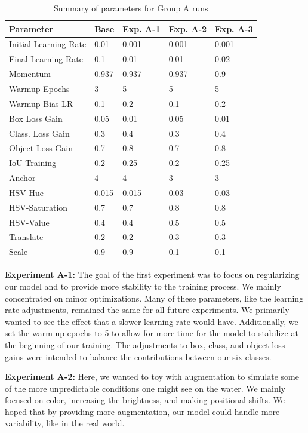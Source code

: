 \documentclass[sigplan,nonacm]{acmart}
\begin{document}
\begin{table}[H]
\centering

\begin{tabular}{|l |l |l |l |l|} \hline  
Parameter & Base& Exp. A-1& Exp. A-2& Exp. A-3\\ \hline 
Initial Learning Rate& 0.01 & 0.001 & 0.001 & 0.001 \\ \hline 
Final Learning Rate& 0.1 & 0.01 & 0.01 & 0.02 \\ \hline 
Momentum& 0.937 & 0.937 & 0.937 & 0.9 \\ \hline 
Warmup Epochs& 3 & 5 & 5 & 5 \\ \hline 
Warmup Bias LR& 0.1 & 0.2 & 0.1 & 0.2 \\ \hline 
Box Loss Gain& 0.05 & 0.01 & 0.05 & 0.01 \\ \hline 
Class. Loss Gain& 0.3 & 0.4 & 0.3 & 0.4 \\ \hline 
Object Loss Gain& 0.7 & 0.8 & 0.7 & 0.8 \\ \hline 
IoU Training& 0.2 & 0.25 & 0.2 & 0.25 \\ \hline 
Anchor& 4 & 4 & 3 & 3 \\ \hline 
HSV-Hue& 0.015 & 0.015 & 0.03 & 0.03 \\ \hline 
HSV-Saturation& 0.7 & 0.7 & 0.8 & 0.8 \\ \hline 
HSV-Value& 0.4 & 0.4 & 0.5 & 0.5 \\ \hline 
Translate& 0.2 & 0.2 & 0.3 & 0.3 \\ \hline 
Scale& 0.9 & 0.9 & 0.1 & 0.1 \\ \hline
\end{tabular}
\caption{Summary of parameters for Group A runs}
\label{tab:parametersA}
\end{table}
\textbf{Experiment A-1:}
The goal of the first experiment was to focus on regularizing our model and to provide more stability to the training process. We mainly concentrated on minor optimizations. Many of these parameters, like the learning rate adjustments, remained the same for all future experiments. We primarily wanted to see the effect that a slower learning rate would have. Additionally, we set the warm-up epochs to 5 to allow for more time for the model to stabilize at the beginning of our training. The adjustments to box, class, and object loss gains were intended to balance the contributions between our six classes. 

\textbf{Experiment A-2: }
Here, we wanted to toy with augmentation to simulate some of the more unpredictable conditions one might see on the water. We mainly focused on color, increasing the brightness, and making positional shifts. We hoped that by providing more augmentation, our model could handle more variability, like in the real world.  
\end{document}

